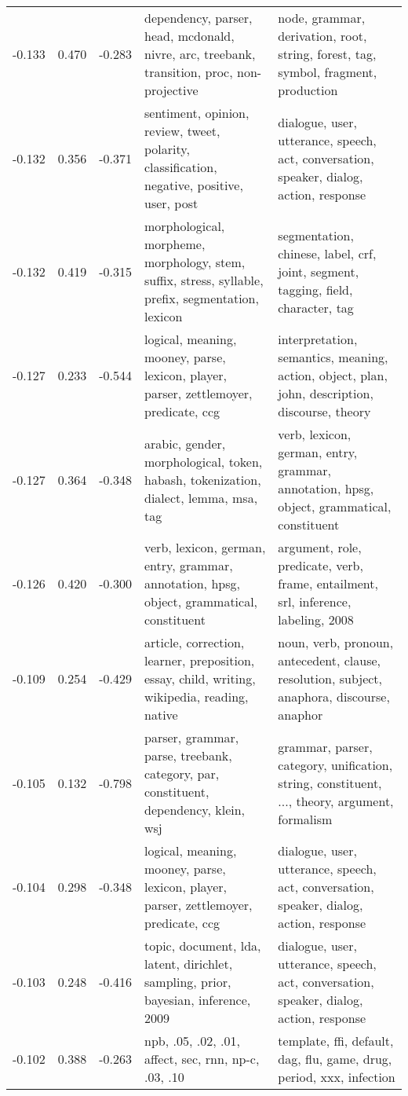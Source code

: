 \begin{tabular}{cccp{5cm}p{5cm}}
-0.133 & 0.470 & -0.283 & dependency, parser, head, mcdonald, nivre, arc, treebank, transition, proc, non-projective & node, grammar, derivation, root, string, forest, tag, symbol, fragment, production \\
-0.132 & 0.356 & -0.371 & sentiment, opinion, review, tweet, polarity, classification, negative, positive, user, post & dialogue, user, utterance, speech, act, conversation, speaker, dialog, action, response \\
-0.132 & 0.419 & -0.315 & morphological, morpheme, morphology, stem, suffix, stress, syllable, prefix, segmentation, lexicon & segmentation, chinese, label, crf, joint, segment, tagging, field, character, tag \\
-0.127 & 0.233 & -0.544 & logical, meaning, mooney, parse, lexicon, player, parser, zettlemoyer, predicate, ccg & interpretation, semantics, meaning, action, object, plan, john, description, discourse, theory \\
-0.127 & 0.364 & -0.348 & arabic, gender, morphological, token, habash, tokenization, dialect, lemma, msa, tag & verb, lexicon, german, entry, grammar, annotation, hpsg, object, grammatical, constituent \\
-0.126 & 0.420 & -0.300 & verb, lexicon, german, entry, grammar, annotation, hpsg, object, grammatical, constituent & argument, role, predicate, verb, frame, entailment, srl, inference, labeling, 2008 \\
-0.109 & 0.254 & -0.429 & article, correction, learner, preposition, essay, child, writing, wikipedia, reading, native & noun, verb, pronoun, antecedent, clause, resolution, subject, anaphora, discourse, anaphor \\
-0.105 & 0.132 & -0.798 & parser, grammar, parse, treebank, category, par, constituent, dependency, klein, wsj & grammar, parser, category, unification, string, constituent, ..., theory, argument, formalism \\
-0.104 & 0.298 & -0.348 & logical, meaning, mooney, parse, lexicon, player, parser, zettlemoyer, predicate, ccg & dialogue, user, utterance, speech, act, conversation, speaker, dialog, action, response \\
-0.103 & 0.248 & -0.416 & topic, document, lda, latent, dirichlet, sampling, prior, bayesian, inference, 2009 & dialogue, user, utterance, speech, act, conversation, speaker, dialog, action, response \\
-0.102 & 0.388 & -0.263 & npb, .05, .02, .01, affect, sec, rnn, np-c, .03, .10 & template, ffi, default, dag, flu, game, drug, period, xxx, infection \\

\end{tabular}
